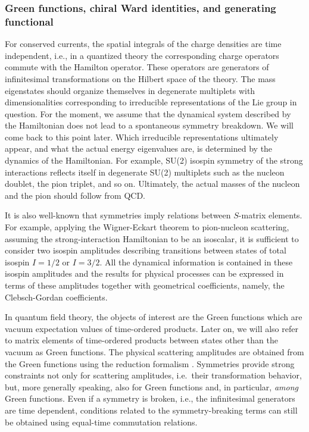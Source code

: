 \documentclass[twoside,12pt]{article}
\begin{document}
\subsubsection{Green functions, chiral Ward identities, and generating functional}
\label{subsubsection_gfcwigf}
  For conserved currents, the spatial integrals of the
charge densities are time independent, i.e., in a quantized theory
the corresponding charge operators commute with the Hamilton operator.
   These operators are generators of infinitesimal transformations
on the Hilbert space of the theory.
   The mass eigenstates should organize themselves in degenerate multiplets
with dimensionalities corresponding to irreducible representations of the Lie
group in question.
   For the moment, we assume that the dynamical system described
by the Hamiltonian does not lead to a spontaneous symmetry breakdown.
   We will come back to this point later.
   Which irreducible representations ultimately appear, and what
the actual energy eigenvalues are, is determined by the dynamics of
the Hamiltonian.
   For example, SU(2) isospin symmetry of the strong interactions reflects
itself in degenerate SU(2) multiplets such as the nucleon doublet,
the pion triplet, and so on.
   Ultimately, the actual masses of the nucleon and the pion should
follow from QCD.

   It is also well-known that symmetries imply relations between $S$-matrix
elements. For example, applying the Wigner-Eckart theorem to pion-nucleon
scattering, assuming the strong-interaction Hamiltonian to be an isoscalar,
it is sufficient to consider two isospin amplitudes describing transitions
between states of total isospin $I=1/2$ or $I=3/2$.
   All the dynamical information is contained in these isospin amplitudes and
the results for physical processes can be expressed in terms of
these amplitudes together with geometrical coefficients, namely,
the Clebsch-Gordan coefficients.


   In quantum field theory, the objects of interest are the
Green functions which are vacuum expectation values of time-ordered
products.
   Later on, we will also refer to matrix elements
of time-ordered products between states other than the vacuum as
Green functions.
   The physical scattering amplitudes are obtained from the Green functions
using the reduction formalism \cite{Lehmann:1954rq}.
   Symmetries provide strong constraints not only for scattering amplitudes,
i.e.~their transformation behavior, but, more generally speaking, also for
Green functions and, in particular, {\em among} Green functions.
  Even if a symmetry is broken, i.e., the infinitesimal
generators are time dependent, conditions related to the
symmetry-breaking terms can still be obtained using equal-time commutation
relations.
\end{document}
